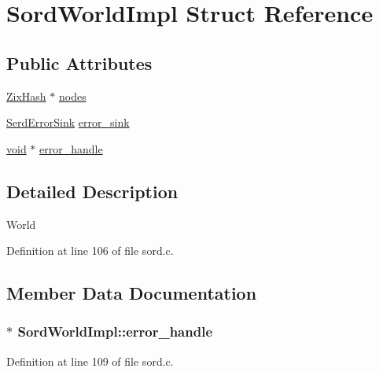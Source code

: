 \hypertarget{struct_sord_world_impl}{}\section{Sord\+World\+Impl Struct Reference}
\label{struct_sord_world_impl}
\subsection*{Public Attributes}
\begin{DoxyCompactItemize}
\item 
\hyperlink{group__zix_ga7bcf5a36494242a0570b0d5c6f9e171b}{Zix\+Hash} $\ast$ \hyperlink{struct_sord_world_impl_a4c4cdcef9843c6fc1f5b6762f847ea2c}{nodes}
\item 
\hyperlink{group__serd_ga925d2fda236697a3e643b307ffe242e5}{Serd\+Error\+Sink} \hyperlink{struct_sord_world_impl_a4a82d0c9c003d1fecaef741f5e072c8d}{error\+\_\+sink}
\item 
\hyperlink{sound_8c_ae35f5844602719cf66324f4de2a658b3}{void} $\ast$ \hyperlink{struct_sord_world_impl_a7a28bab8463feb35b01098b088a69df1}{error\+\_\+handle}
\end{DoxyCompactItemize}


\subsection{Detailed Description}
World 

Definition at line 106 of file sord.\+c.



\subsection{Member Data Documentation}
\subsubsection[{\texorpdfstring{error\+\_\+handle}{error_handle}}]{$\ast$ Sord\+World\+Impl\+::error\+\_\+handle}\hypertarget{struct_sord_world_impl_a7a28bab8463feb35b01098b088a69df1}{}\label{struct_sord_world_impl_a7a28bab8463feb35b01098b088a69df1}


Definition at line 109 of file sord.\+c.

